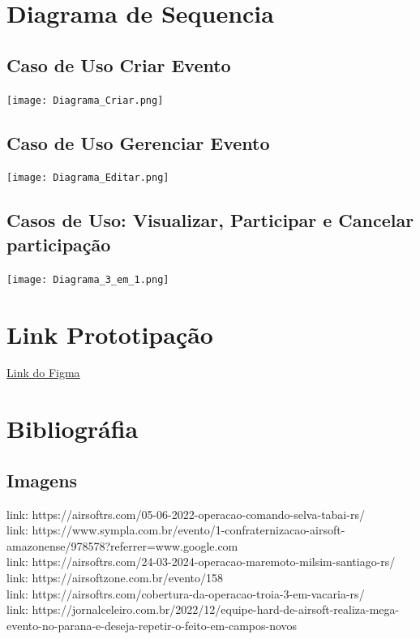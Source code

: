 \documentclass[12pt,a4paper]{article}
\begin{document}
\section{Diagrama de Sequencia}

\subsection{Caso de Uso Criar Evento}
 \texttt{[image: Diagrama\_Criar.png]}

\subsection{Caso de Uso Gerenciar Evento}
 \texttt{[image: Diagrama\_Editar.png]}


\subsection{Casos de Uso: Visualizar, Participar e Cancelar participação}
 \texttt{[image: Diagrama\_3\_em\_1.png]}

\section{Link Prototipação}
\href{https://www.figma.com/design/hQo4WzJU1nHs5j3TelntQZ/Sem-t%C3%ADtulo?node-id=0-1&p=f}{\color{blue}\uline{Link do Figma}}


\section{Bibliográfia}

\subsection{Imagens}
\sloppy
link: https://airsoftrs.com/05-06-2022-operacao-comando-selva-tabai-rs/ \\
link: https://www.sympla.com.br/evento/1-confraternizacao-airsoft-amazonense/978578?referrer=www.google.com \\
link: https://airsoftrs.com/24-03-2024-operacao-maremoto-milsim-santiago-rs/ \\
link: https://airsoftzone.com.br/evento/158 \\
link: https://airsoftrs.com/cobertura-da-operacao-troia-3-em-vacaria-rs/ \\
link: https://jornalceleiro.com.br/2022/12/equipe-hard-de-airsoft-realiza-mega-evento-no-parana-e-deseja-repetir-o-feito-em-campos-novos \\
\end{document}
